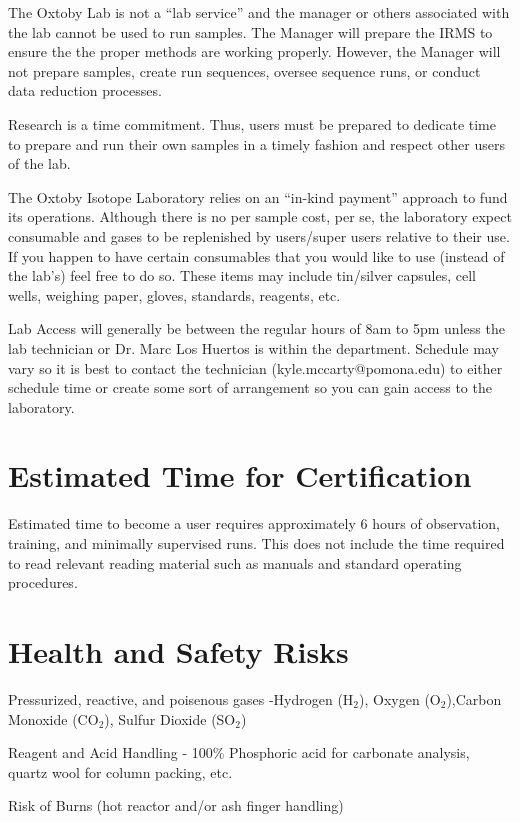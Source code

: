\documentclass[12pt]{../SOP3_beta}\usepackage[]{graphicx}\usepackage[]{color}
\begin{document}
\NP The Oxtoby Lab is not a ``lab service'' and the manager or others associated with the lab cannot be used to run samples. The Manager will prepare the IRMS to ensure the the proper methods are working properly. However, the Manager will not prepare samples, create run sequences, oversee sequence runs, or conduct data reduction processes. 

\NP Research is a time commitment. Thus, users must be prepared to dedicate time to prepare and run their own samples in a timely fashion and respect other users of the lab. 

\NP The Oxtoby Isotope Laboratory relies on an ``in-kind payment'' approach to fund its operations. Although there is no per sample cost, per se, the laboratory expect consumable and gases to be replenished by users/super users relative to their use. If you happen to have certain consumables that you would like to use (instead of the lab's) feel free to do so. These items may include tin/silver capsules, cell wells, weighing paper, gloves, standards, reagents, etc.

\NP Lab Access will generally be between the regular hours of 8am to 5pm unless the lab technician or Dr. Marc Los Huertos is within the department. Schedule may vary so it is best to contact the technician (kyle.mccarty@pomona.edu) to either schedule time or create some sort of arrangement so you can gain access to the laboratory.

\section{Estimated Time for Certification}

\NP Estimated time to become a user requires approximately 6 hours of observation, training, and minimally supervised runs. This does not include the time required to read relevant reading material such as manuals and standard operating procedures.

\section{Health and Safety Risks}

\NP Pressurized, reactive, and poisenous gases -Hydrogen (H$_2$), Oxygen (O$_2$),Carbon Monoxide (CO$_2$), Sulfur Dioxide (SO$_2$)

\NP Reagent and Acid Handling - 100\% Phosphoric acid for carbonate analysis, quartz wool for column packing, etc. 

\NP Risk of Burns (hot reactor and/or ash finger handling)
\end{document}
